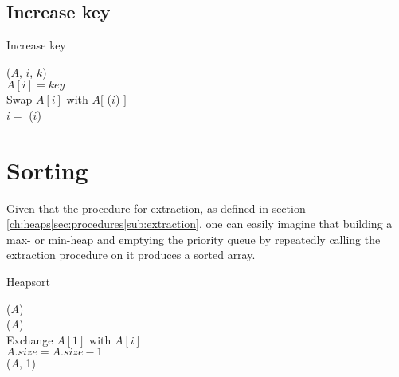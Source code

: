 \subsection{Increase key}
\label{ch:heaps|sec:procedures|sub:increase-key}
\begin{algorithm}[H]
	\caption{Increase key}
	\label{alg:heap-increase-key}
	
	
	
	
	
	\BlankLine
	\IncreaseKey($A$, $i$, $k$) \\
	\Begin
	{
		$A[i] = key$ \\
		{
			Swap $A[i]$ with $A[$ \Parent($i$) $]$ \\
			$i = $ \Parent($i$)
		}
	}
\end{algorithm}


\section{Sorting}
Given that the procedure for extraction, as defined in section
\ref{ch:heaps|sec:procedures|sub:extraction}, one can easily imagine that
building a max- or min-heap and emptying the priority queue by repeatedly
calling the extraction procedure on it produces a sorted array.

\begin{algorithm}[H]
	\caption{Heapsort}
	\label{alg:heapsort}
	
	
	
	
	
	\BlankLine
	\HeapSort($A$) \\
	\Begin
	{
		\BuildMaxHeap($A$) \\
		{
			Exchange $A[1]$ with $A[i]$ \\
			$A.size = A.size - 1$ \\
			\MaxHeapify($A$, 1)
		}
	}
\end{algorithm}

